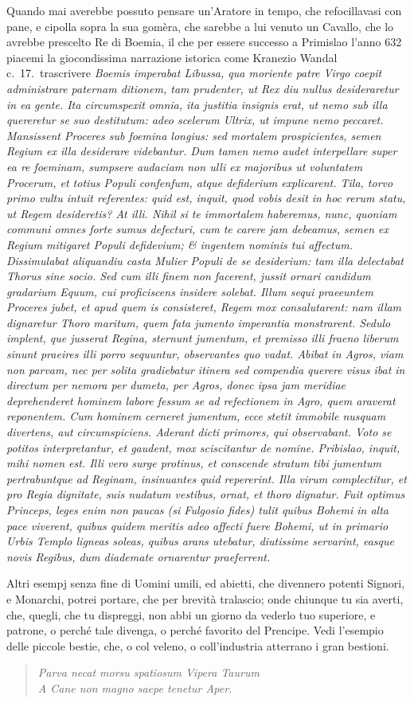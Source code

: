 \documentclass[11pt,a6paper]{article}
\newcommand{\literaryquote}[1]{%
\kern -6pt  \begin{verse}
    {\footnotesize \it #1}
  \end{verse}\kern -2pt%
}
\begin{document}
{Quando mai averebbe possuto pensare un'Aratore in tempo,
che refocillavasi con pane, e cipolla
sopra la sua gomèra, che sarebbe a lui venuto un
Cavallo, che lo avrebbe prescelto Re di Boemia,
il che per essere successo a Primislao l'anno 632
piacemi la giocondissima narrazione istorica come
Kranezio Wandal c.\ 17.\ trascrivere \textit{Boemis imperabat
Libussa, qua moriente patre Virgo coepit
administrare paternam ditionem, tam prudenter,
ut Rex diu nullus desideraretur in ea gente. Ita circumspexit
omnia, ita justitia insignis erat, ut nemo
sub illa quereretur se suo destitutum: adeo scelerum
Ultrix, ut impune nemo peccaret. Mansissent
Proceres sub foemina longius: sed mortalem
prospicientes, semen Regium ex illa desiderare
videbantur. Dum tamen nemo audet interpellare super ea
re foeminam, sumpsere audaciam non ulli ex majoribus
ut voluntatem Procerum, et totius Populi
confenfum, atque defiderium explicarent. Tila, torvo
primo vultu intuit referentes: quid est, inquit,
quod vobis desit in hoc rerum statu, ut Regem
desideretis? At illi. Nihil si te immortalem haberemus,
nunc, quoniam communi omnes forte sumus
defecturi, cum te carere jam debeamus, semen ex
Regium mitigaret Populi defidevium; \& ingentem nominis
tui affectum. Dissimulabat aliquandiu casta
Mulier Populi de se desiderium: tam illa delectabat
Thorus sine socio. Sed cum illi finem non
facerent, jussit ornari candidum gradarium Equum,
cui proficiscens insidere solebat. Illum sequi praeeuntem
Proceres jubet, et apud quem is consisteret,
Regem mox consalutarent: nam illam dignaretur
Thoro maritum, quem fata jumento imperantia
monstrarent. Sedulo implent, que jusserat
Regina, sternunt jumentum, et premisso illi fraeno
liberum sinunt praeires illi porro sequuntur,
observantes quo vadat. Abibat in Agros, viam non
parvam, nec per solita gradiebatur itinera sed
compendia querere visus ibat in directum per nemora
per dumeta, per Agros, donec ipsa jam meridiae
deprehenderet hominem labore fessum se ad refectionem
in Agro, quem araverat reponentem. Cum
hominem cerneret jumentum, ecce stetit immobile
nusquam divertens, aut circumspiciens. Aderant
dicti primores, qui observabant. Voto se potitos
interpretantur, et gaudent, mox sciscitantur de
nomine. Pribislao, inquit, mihi nomen est. Illi
vero surge protinus, et conscende stratum tibi
jumentum pertrabuntque ad Reginam, insinuantes
quid repererint. Illa virum complectitur, et pro
Regia dignitate, suis nudatum vestibus, ornat,
et thoro dignatur. Fuit optimus Princeps, leges
enim non paucas (si Fulgosio fides) tulit quibus
Bohemi in alta pace viverent, quibus quidem
meritis adeo affecti fuere Bohemi, ut in primario Urbis
Templo ligneas soleas, quibus arans utebatur,
diutissime servarint, easque novis Regibus, dum
diademate ornarentur praeferrent.}

Altri esempj senza fine di Uomini umili, ed
abietti, che divennero potenti Signori, e
Monarchi, potrei portare, che per brevità tralascio; onde
chiunque tu sia averti, che, quegli, che tu dispreggi,
non abbi un giorno da vederlo tuo superiore,
e patrone, o perché tale divenga, o perché
favorito del Prencipe. Vedi l'esempio delle piccole
bestie, che, o col veleno, o coll'industria atterrano i
gran bestioni.
\literaryquote{Parva necat morsu spatiosum Vipera Taurum\\
A Cane non magno saepe tenetur Aper.}
}
\end{document}
